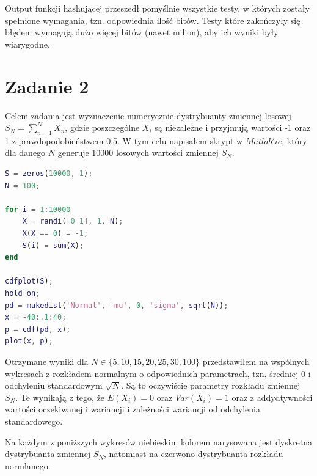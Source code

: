 \documentclass[12pt]{article}
\begin{document}
Output funkcji hashującej przeszedł pomyślnie wszystkie testy, w których zostały spełnione wymagania, tzn. odpowiednia ilość bitów. Testy które zakończyły się błędem wymagają dużo więcej bitów (nawet milion), aby ich wyniki były wiarygodne.

\section{Zadanie 2}
Celem zadania jest wyznaczenie numerycznie dystrybuanty zmiennej losowej $S_N = \sum_{n=1}^{N}X_n$, gdzie poszczególne $X_i$ są niezależne i przyjmują wartości -1 oraz 1 z prawdopodobieństwem 0.5. W tym celu napisałem skrypt w $Matlab'ie$, który dla danego $N$ generuje 10000 losowych wartości zmiennej $S_N$.

\begin{lstlisting}[language=Matlab, caption=custom\_dist.m]
S = zeros(10000, 1);
N = 100;
    
for i = 1:10000
    X = randi([0 1], 1, N);
    X(X == 0) = -1;
    S(i) = sum(X);
end

cdfplot(S);
hold on;
pd = makedist('Normal', 'mu', 0, 'sigma', sqrt(N));
x = -40:.1:40;
p = cdf(pd, x);
plot(x, p);
\end{lstlisting}

Otrzymane wyniki dla $N \in \{5,10,15,20,25,30,100\}$ przedstawiłem na wspólnych wykresach z rozkładem normalnym o odpowiednich parametrach, tzn. średniej 0 i odchyleniu standardowym $\sqrt{N}$. Są to oczywiście parametry rozkładu zmiennej $S_N$. Te wynikają z tego, że $E(X_i)=0$ oraz $Var(X_i)=1$ oraz z addydtywności wartości oczekiwanej i wariancji i zależności wariancji od odchylenia standardowego. \par
Na każdym z poniższych wykresów niebieskim kolorem narysowana jest dyskretna dystrybuanta zmiennej $S_N$, natomiast na czerwono dystrybuanta rozkładu normlanego.
\end{document}
